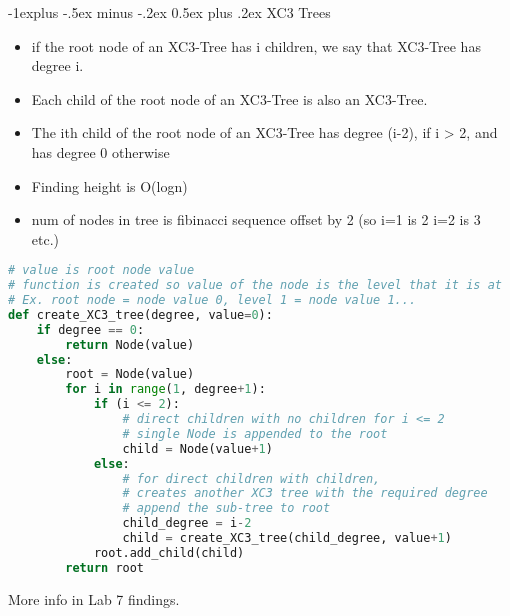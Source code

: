 \documentclass[letterpaper, 8pt]{extarticle}
\makeatletter
\renewcommand{\subsection}{\@startsection{subsection}{2}{0mm}%
                                {-1explus -.5ex minus -.2ex}%
                                {0.5ex plus .2ex}%
                                {\normalfont\small\bfseries}}
\makeatother
\begin{document}
\begin{multicols*}{5}
\begin{lstlisting}[language=Python, breaklines=true, postbreak=\mbox{\textcolor{red}{$\hookrightarrow$}\space}]
\end{lstlisting}
\subsection{XC3 Trees}
\begin{itemize}
    \item if the root node of an XC3-Tree has i children, we say that XC3-Tree has degree i.
    \item Each child of the root node of an XC3-Tree is also an XC3-Tree.
    \item The ith child of the root node of an XC3-Tree has degree (i-2), if i > 2, and has degree 0
otherwise
\item Finding height is O(logn)
\item num of nodes in tree is fibinacci sequence offset by 2 (so i=1 is 2 i=2 is 3 etc.)
\end{itemize}
\begin{lstlisting}[language=Python]
# value is root node value
# function is created so value of the node is the level that it is at
# Ex. root node = node value 0, level 1 = node value 1...
def create_XC3_tree(degree, value=0):
    if degree == 0:
        return Node(value)
    else:
        root = Node(value)
        for i in range(1, degree+1):
            if (i <= 2):
                # direct children with no children for i <= 2
                # single Node is appended to the root
                child = Node(value+1)
            else:
                # for direct children with children,
                # creates another XC3 tree with the required degree
                # append the sub-tree to root
                child_degree = i-2
                child = create_XC3_tree(child_degree, value+1)
            root.add_child(child)
        return root
\end{lstlisting}
More info in Lab 7 findings.

\end{multicols*}
\end{document}
